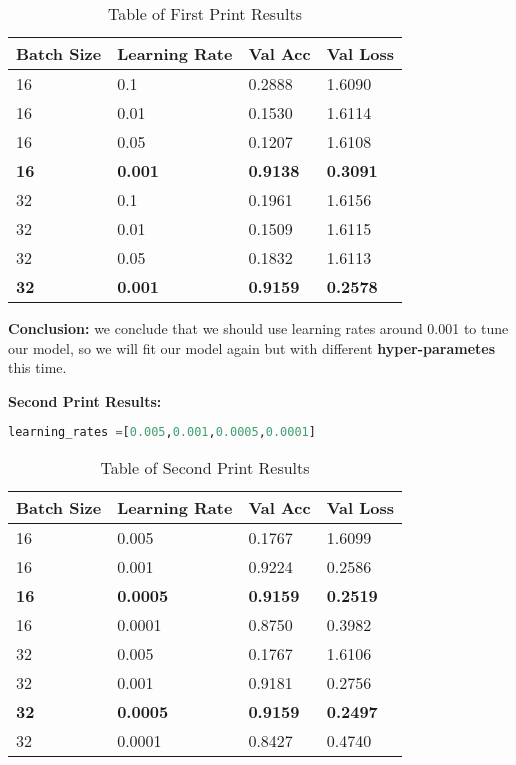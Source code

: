 \documentclass[12pt,a4paper]{article}
\begin{document}
\begin{table}[H]
\centering
\renewcommand{\arraystretch}{1} %
\begin{tabular}{|p{3cm}|p{3cm}|p{3cm}|p{3cm}|}
	\hline
	\textbf{Batch Size}&\textbf{Learning Rate}&\textbf{Val Acc}&\textbf{Val Loss}\\
	\hline
16 & 0.1 & 0.2888 & 1.6090\\
	\hline
16 & 0.01 & 0.1530 &1.6114\\
	\hline
16 & 0.05 & 0.1207 & 1.6108\\
	\hline
\textbf{16} & \textbf{0.001} & \textbf{0.9138} & \textbf{0.3091}\\
	\hline
32 & 0.1 & 0.1961 & 1.6156\\
	\hline
32 & 0.01 & 0.1509 & 1.6115\\
	\hline
32 & 0.05 & 0.1832 & 1.6113\\
	\hline
\textbf{32} & \textbf{0.001} & \textbf{0.9159} & \textbf{0.2578}\\
	\hline
\end{tabular}
\caption{Table of First Print Results}
\label{tab:first_print_results}
\end{table}

\textbf{Conclusion:}
we conclude that we should use learning rates around 0.001 to tune our model, so we will fit our model again but with different \textbf{hyper-parametes} this time.

\textbf{Second Print Results:}
\begin{lstlisting}[language=Python]
learning_rates =[0.005,0.001,0.0005,0.0001]
\end{lstlisting}

\begin{table}[H]
\centering
\renewcommand{\arraystretch}{1} %
\begin{tabular}{|p{3cm}|p{3cm}|p{3cm}|p{3cm}|}
	\hline
	\textbf{Batch Size}&\textbf{Learning Rate}&\textbf{Val Acc}&\textbf{Val Loss}\\
	\hline
16 & 0.005 & 0.1767 & 1.6099\\
	\hline
16 & 0.001 & 0.9224 & 0.2586\\
	\hline
\textbf{16} & \textbf{0.0005} & \textbf{0.9159} & \textbf{0.2519}\\
	\hline
16 & 0.0001 & 0.8750 & 0.3982\\
	\hline
32 & 0.005 & 0.1767 & 1.6106\\
	\hline
32 & 0.001 & 0.9181 & 0.2756\\
	\hline
\textbf{32} & \textbf{0.0005} & \textbf{0.9159} & \textbf{0.2497}\\
	\hline
32 & 0.0001 & 0.8427 & 0.4740\\
	\hline
\end{tabular}
\caption{Table of Second Print Results}
\label{tab:second_print_results}
\end{table}
\end{document}
